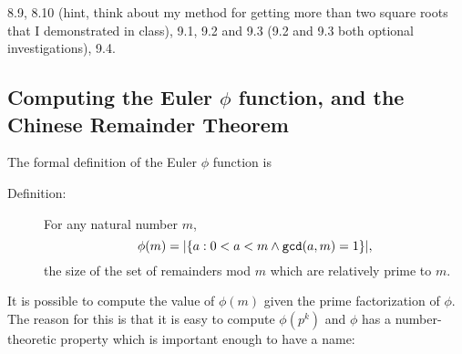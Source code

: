 \documentclass[12pt]{article}
\begin{document}
8.9, 8.10 (hint, think about my method for getting more than two square roots that I demonstrated in class),  9.1, 9.2 and 9.3 (9.2 and 9.3 both optional investigations), 9.4.



\subsection{Computing the Euler $\phi$ function, and the Chinese Remainder Theorem}

The formal definition of the Euler $\phi$ function is

\begin{description}

\item[Definition:]  For any natural number $m$, $$\phi(m)=|\{a : 0<a<m \wedge {\tt gcd}(a,m)=1\}|,$$ the size of the set of remainders mod $m$ which are relatively prime to $m$.

\end{description}

It is possible to compute the value of $\phi(m)$ given the prime factorization of $\phi$.   The reason for this is that it is easy to compute $\phi(p^k)$ and $\phi$ has a number-theoretic property which is important enough to have a name:
\end{document}
